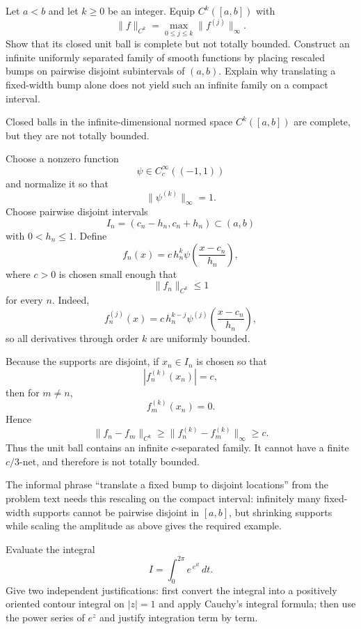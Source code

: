 \begin{problem}[CP-IV-0120]
\label{prob:cp-iv-0120}
Let $a<b$ and let $k\ge0$ be an integer. Equip $C^k([a,b])$ with
\[
\|f\|_{C^k}=\max_{0\le j\le k}\|f^{(j)}\|_\infty.
\]
Show that its closed unit ball is complete but not totally bounded.
Construct an infinite uniformly separated family of smooth functions
by placing rescaled bumps on pairwise disjoint subintervals of $(a,b)$.
Explain why translating a fixed-width bump alone does not yield such an
infinite family on a compact interval.
\end{problem}

\begin{solution}
Closed balls in the infinite-dimensional normed space \(C^k([a,b])\) are complete, but they are not totally bounded.

Choose a nonzero function
\[
\psi\in C_c^\infty((-1,1))
\]
and normalize it so that
\[
\|\psi^{(k)}\|_\infty=1.
\]
Choose pairwise disjoint intervals
\[
I_n=(c_n-h_n,c_n+h_n)\subset(a,b)
\]
with \(0<h_n\le1\). Define
\[
f_n(x)
=
c\,h_n^k
\psi\!\left(\frac{x-c_n}{h_n}\right),
\]
where \(c>0\) is chosen small enough that
\[
\|f_n\|_{C^k}\le1
\]
for every \(n\). Indeed,
\[
f_n^{(j)}(x)
=
c\,h_n^{k-j}
\psi^{(j)}\!\left(\frac{x-c_n}{h_n}\right),
\]
so all derivatives through order \(k\) are uniformly bounded.

Because the supports are disjoint, if \(x_n\in I_n\) is chosen so that
\[
|f_n^{(k)}(x_n)|=c,
\]
then for \(m\neq n\),
\[
f_m^{(k)}(x_n)=0.
\]
Hence
\[
\|f_n-f_m\|_{C^k}
\ge
\|f_n^{(k)}-f_m^{(k)}\|_\infty
\ge c.
\]
Thus the unit ball contains an infinite \(c\)-separated family. It cannot have a finite \(c/3\)-net, and therefore is not totally bounded.

The informal phrase ``translate a fixed bump to disjoint locations'' from the problem text needs this rescaling on the compact interval: infinitely many fixed-width supports cannot be pairwise disjoint in \([a,b]\), but shrinking supports while scaling the amplitude as above gives the required example.
\end{solution}


\begin{problem}[CP-IV-0121]
\label{prob:cp-iv-0121}
Evaluate the integral
\[
I=\int_0^{2\pi}e^{\,e^{it}}\,dt.
\]
Give two independent justifications: first convert the integral
into a positively oriented contour integral on $|z|=1$ and apply
Cauchy's integral formula; then use the power series of $e^z$
and justify integration term by term.
\end{problem}

